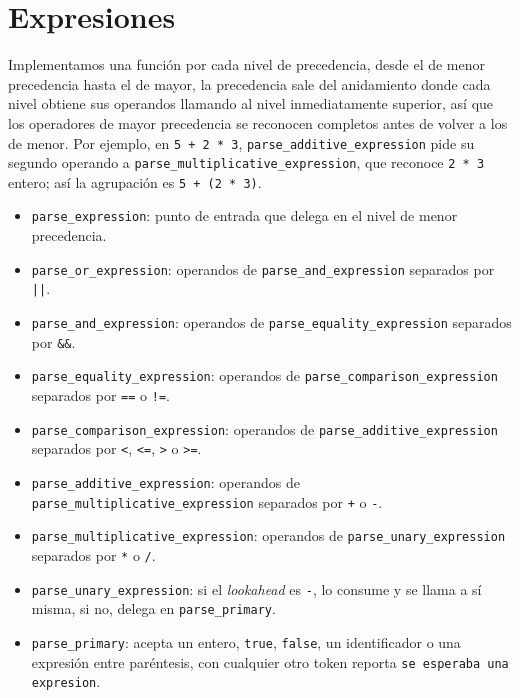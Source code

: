 \documentclass[12pt,letterpaper]{article}
\begin{document}
\bigskip


\section*{Expresiones}

Implementamos una función por cada nivel de precedencia, desde el de menor precedencia hasta el de mayor,
la precedencia sale del anidamiento donde cada nivel obtiene sus operandos llamando al nivel inmediatamente
superior, así que los operadores de mayor precedencia se reconocen completos antes de volver a los de menor.
Por ejemplo, en \texttt{5 + 2 * 3}, \texttt{parse\_additive\_expression} pide su segundo operando a
\texttt{parse\_multiplicative\_expression}, que reconoce \texttt{2 * 3} entero; así la agrupación es
\texttt{5 + (2 * 3)}.

\begin{itemize}
\item \texttt{parse\_expression}: punto de entrada que delega en el nivel de menor precedencia.
  
\item \texttt{parse\_or\_expression}: operandos de \texttt{parse\_and\_expression} separados por
  \texttt{||}.
  
\item \texttt{parse\_and\_expression}: operandos de \texttt{parse\_equality\_expression} separados por
  \texttt{\&\&}.
  
\item \texttt{parse\_equality\_expression}: operandos de \texttt{parse\_comparison\_expression} separados por
  \texttt{==} o \texttt{!=}.
  
\item \texttt{parse\_comparison\_expression}: operandos de \texttt{parse\_additive\_expression} separados por
  \texttt{<}, \texttt{<=}, \texttt{>} o \texttt{>=}.
  
\item \texttt{parse\_additive\_expression}: operandos de \texttt{parse\_multiplicative\_expression} separados
  por \texttt{+} o \texttt{-}.
  
\item \texttt{parse\_multiplicative\_expression}: operandos de \texttt{parse\_unary\_expression} separados
  por \texttt{*} o \texttt{/}.
  
\item \texttt{parse\_unary\_expression}: si el \emph{lookahead} es \texttt{-}, lo consume y se llama a sí misma,
  si no, delega en \texttt{parse\_primary}.
  
\item \texttt{parse\_primary}: acepta un entero, \texttt{true}, \texttt{false}, un identificador o una
  expresión entre paréntesis, con cualquier otro token reporta \texttt{se esperaba una expresion}.
\end{itemize}
\end{document}
